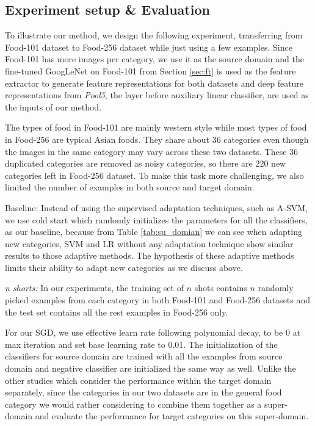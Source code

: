 \subsection{Experiment setup \& Evaluation}
To illustrate our method, we design the following experiment, transferring from Food-101 dataset to Food-256 dataset while just using a few examples. Since Food-101 has more images per category, we use it as the source domain and the fine-tuned GoogLeNet on Food-101 from Section \ref{sec:ft} is used as the feature extractor to generate feature representations for both datasets and deep feature representations from \emph{Pool5}, the layer before auxiliary linear classifier, are used as the inputs of our method.

The types of food in Food-101 are mainly western style while most types of food in Food-256 are typical Asian foods. They share about 36 categories even though the images in the same category may vary across these two datasets. These 36 duplicated categories are removed as noisy categories, so there are 220 new categories left in Food-256 dataset.
To make this task more challenging, we also limited the number of examples in both source and target domain.

Baseline: Instead of using the supervised adaptation techniques, such as A-SVM, we use cold start which randomly initializes the parameters for all the classifiers, as our baseline, because from Table \ref{tab:su_domian} we can see when adapting new categories, SVM and LR without any adaptation technique show similar results to those adaptive methods. The hypothesis of these adaptive methods limits their ability to adapt new categories as we discuss above.

\emph{n shorts:} In our experiments, the training set of $n$ shots contains $n$ randomly picked examples from each category in both Food-101 and Food-256 datasets and the test set contains all the rest examples in Food-256 only.

For our SGD, we use effective learn rate following polynomial decay, to be 0 at max iteration and set base learning rate to 0.01. The initialization of the classifiers for source domain are trained with all the examples from source domain and negative classifier are initialized the same way as well. Unlike the other studies which consider the performance within the target domain separately, since the categories in our two datasets are in the general food category we would rather considering to combine them together as a super-domain and evaluate the performance for target categories on this super-domain.
